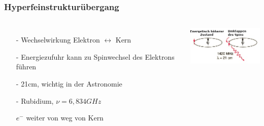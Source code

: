\begin{frame}
	\frametitle{Hyperfeinstrukturübergang}
	\begin{columns}
		\begin{itemize}
			\item[-] Wechselwirkung Elektron $\leftrightarrow$ Kern
			\item[-] Energiezufuhr kann zu Spinwechsel des Elektrons führen
			\item[ ]
			\item[-] 21cm, wichtig in der Astronomie
			\item[] 
			\item[-] Rubidium, $\nu =6,834 GHz$
			\item[ ] $e^-$ weiter von weg von Kern
		\end{itemize}
		\includegraphics[width = 4cm]{./pictures/h21b}
	\end{columns}
	
\end{frame}



